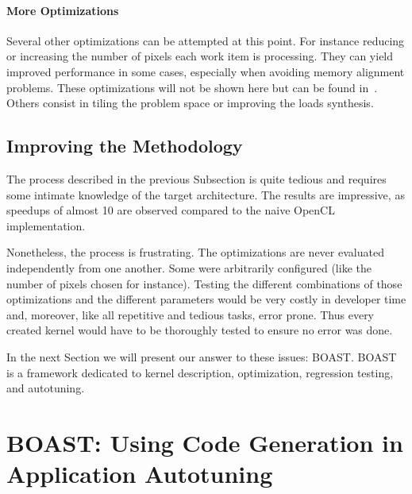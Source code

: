 \documentclass{IEEEtran}
\begin{document}
\paragraph{More Optimizations} Several other optimizations can be attempted at
this point. For instance reducing or increasing the number of pixels each work
item is processing. They can yield improved performance in some cases,
especially when avoiding memory alignment problems. These optimizations will
not be shown here but can be found in~\cite{opencl_arm_training}. Others
consist in tiling the problem space or improving the loads synthesis.

\subsection{Improving the Methodology}

The process described in the previous Subsection is quite tedious and requires
some intimate knowledge of the target architecture. The results are impressive,
as speedups of almost 10 are observed compared to the naive OpenCL
implementation.

Nonetheless, the process is frustrating. The optimizations are never evaluated
independently from one another. Some were arbitrarily configured (like the
number of pixels chosen for instance). Testing the different combinations of
those optimizations and the different parameters would be very costly in
developer time and, moreover, like all repetitive and tedious tasks, error
prone. Thus every created kernel would have to be thoroughly tested to ensure
no error was done.

In the next Section we will present our answer to these issues: BOAST.  BOAST
is a framework dedicated to kernel description, optimization, regression
testing, and autotuning.

\section{BOAST: Using Code Generation in Application Autotuning\label{sec:boast}}
\end{document}
